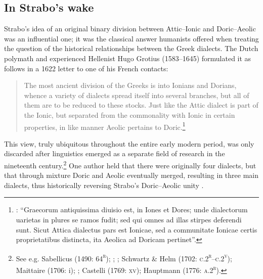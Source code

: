 \documentclass[output=paper]{langsci/langscibook}
\begin{document}
\subsection{In Strabo’s wake}
\hypertarget{Toc19704836}{}
Strabo’s idea of an original binary division between Attic–Ionic and Doric–Aeolic was an influential one; it was the classical answer humanists offered when treating the question of the historical relationships between the Greek dialects. The Dutch polymath and experienced Hellenist Hugo Grotius (1583–1645) formulated it as follows in a 1622 letter to one of his French contacts:

\begin{quote}
The most ancient division of the Greeks is into Ionians and Dorians, whence a variety of dialects spread itself into several branches, but all of them are to be reduced to these stocks. Just like the Attic dialect is part of the Ionic, but separated from the commonality with Ionic in certain properties, in like manner Aeolic pertains to Doric.\footnote{\citet[143]{Grotius1648}: “Graecorum antiquissima diuisio est, in Iones et Dores; unde dialectorum uarietas in plures se ramos fudit; sed qui omnes ad illas stirpes deferendi sunt. Sicut Attica dialectus pars est Ionicae, sed a communitate Ionicae certis proprietatibus distincta, ita Aeolica ad Doricam pertinet”.}
\end{quote}

This view, truly ubiquitous throughout the entire early modern period, was only discarded after linguistics emerged as a separate field of research in the nineteenth century.\footnote{See e.g. Sabellicus (1490: 64\textsc{\textsuperscript{r}}); \citet[235]{Estienne1573}; \citet[563]{Lancelot1655}; Schwartz \& Helm (1702: \textsc{c.2}\textsc{\textsuperscript{r}}–\textsc{c.2}\textsc{\textsuperscript{v}}); Maittaire (1706: i); \citet[82]{Vitringa1712}; Castelli (1769: \textsc{xv}); Hauptmann (1776: \textsc{a.2}\textsc{\textsuperscript{r}}).} One author held that there were originally four dialects, but that through mixture Doric and Aeolic eventually merged, resulting in three main dialects, thus historically reversing Strabo’s Doric–Aeolic unity \citep[20]{Gedike1782}.
\end{document}

